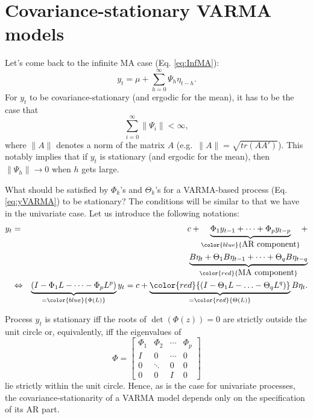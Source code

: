 \documentclass[
  12pt,
]{book}
\theoremstyle{definition}
\theoremstyle{definition}
\theoremstyle{definition}
\theoremstyle{definition}
\theoremstyle{remark}
\begin{document}
\hypertarget{covariance-stationary-varma-models}{%
\section{Covariance-stationary VARMA models}\label{covariance-stationary-varma-models}}

Let's come back to the infinite MA case (Eq. \eqref{eq:InfMA}):
\[
y_t = \mu + \sum_{h=0}^\infty \Psi_{h} \eta_{t-h}.
\]
For \(y_t\) to be covariance-stationary (and ergodic for the mean), it has to be the case that
\begin{equation}
\sum_{i=0}^\infty \|\Psi_i\| < \infty,\label{eq:condiInfiniteMA}
\end{equation}
where \(\|A\|\) denotes a norm of the matrix \(A\) (e.g.~\(\|A\|=\sqrt{tr(AA')}\)). This notably implies that if \(y_t\) is stationary (and ergodic for the mean), then \(\|\Psi_h\|\rightarrow 0\) when \(h\) gets large.

What should be satisfied by \(\Phi_k\)'s and \(\Theta_k\)'s for a VARMA-based process (Eq. \eqref{eq:yVARMA}) to be stationary? The conditions will be similar to that we have in the univariate case. Let us introduce the following notations:
\begin{eqnarray}
y_t &=& c + \underbrace{\Phi_1 y_{t-1} + \dots +\Phi_p y_{t-p}}_{\color{blue}{\mbox{AR component}}} +  \label{eq:VARMA2}\\
&&\underbrace{B \eta_t+ \Theta_1 B \eta_{t-1}+ \dots+ \Theta_q B \eta_{t-q}}_{\color{red}{\mbox{MA component}}} \nonumber\\
&\Leftrightarrow& \underbrace{(I - \Phi_1 L - \dots - \Phi_p L^p)}_{= \color{blue}{\Phi(L)}}y_t = c +  \underbrace{ \color{red}{(I - \Theta_1 L - \ldots - \Theta_q L^q)}}_{=\color{red}{\Theta(L)}} B \eta_{t}. \nonumber
\end{eqnarray}

Process \(y_t\) is stationary iff the roots of \(\det(\Phi(z))=0\) are strictly outside the unit circle or, equivalently, iff the eigenvalues of
\begin{equation}
\Phi = \left[\begin{array}{cccc}
\Phi_{1} & \Phi_{2} & \cdots & \Phi_{p}\\
I & 0 & \cdots & 0\\
0 & \ddots & 0 & 0\\
0 & 0 & I & 0\end{array}\right]\label{eq:matrixPHI}
\end{equation}
lie strictly within the unit circle. Hence, as is the case for univariate processes, the covariance-stationarity of a VARMA model depends only on the specification of its AR part.
\end{document}
